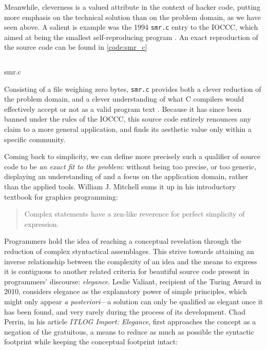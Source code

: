 Meanwhile, cleverness is a valued attribute in the context of hacker code, putting more emphasis on the technical solution than on the problem domain, as we have seen above. A salient is example was the 1994 \lstinline{smr.c} entry to the IOCCC, which aimed at being the smallest self-reproducing program \citep{kanakarakis_international_2022}. An exact reproduction of the source code can be found in \ref{code:smr_c}

\begin{listing}
  \inputminted{c}{./corpus/smr.c}
  \caption{smr.c}
  \label{code:smr_c}
\end{listing}

Consisting of a file weighing zero bytes, \lstinline{smr.c} provides both a clever reduction of the problem domain, and a clever understanding of what C compilers would effectively accept or not as a valid program text \citep{kanakarakis_international_2022a}. Because it has since been banned under the rules of the IOCCC, this source code entirely renounces any claim to a more general application, and finds its aesthetic value only within a specific community.

Coming back to simplicity, we can define more precisely such a qualifier of source code to be \emph{an exact fit to the problem}: without being too precise, or too generic, displaying an understanding of and a focus on the application domain, rather than the applied tools. William J. Mitchell sums it up in his introductory textbook for graphics programming:

\begin{quote}
  Complex statements have a zen-like reverence for perfect simplicity of expression. \citep{mitchell_art_1987}
\end{quote}

Programmers hold the idea of reaching a conceptual revelation through the reduction of complex styntactical assemblages. This strive towards attaining an inverse relationship between the complexity of an idea and the means to express it is contiguous to another related criteria for beautiful source code present in programmers' discourse: \emph{elegance}. Leslie Valiant, recipient of the Turing Award in 2010, considers elegance as the explanatory power of simple principles, which might only appear \emph{a posteriori}—a solution can only be qualified as elegant once it has been found, and very rarely during the process of its development\citep{anthes_beauty_2011}. Chad Perrin, in his article \emph{ITLOG Import: Elegance}, first approaches the concept as a negation of the gratuitous, a means to reduce as much as possible the syntactic footprint while keeping the conceptual footprint intact:

